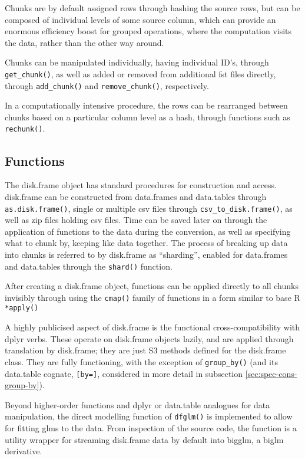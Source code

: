 Chunks are by default assigned rows through hashing the source rows, but
can be composed of individual levels of some source column, which can
provide an enormous efficiency boost for grouped operations, where the
computation visits the data, rather than the other way around.

Chunks can be manipulated individually, having individual ID's, through
\texttt{get_chunk()}, as well as added or
removed from additional fst files directly, through
\texttt{add_chunk()} and
\texttt{remove_chunk()}, respectively.

In a computationally intensive procedure, the rows can be rearranged
between chunks based on a particular column level as a hash, through
functions such as \texttt{rechunk()}.

\hypertarget{sec:functions}{%
    \subsection{Functions}\label{sec:functions}}

The disk.frame object has standard procedures for construction and
access. disk.frame can be constructed from data.frames and data.tables
through \texttt{as.disk.frame()}, single or
multiple csv files through
\texttt{csv_to_disk.frame()}, as well as zip
files holding csv files. Time can be saved later on through the
application of functions to the data during the conversion, as well as
specifying what to chunk by, keeping like data together. The process of
breaking up data into chunks is referred to by disk.frame as
``sharding'', enabled for data.frames and data.tables through the
\texttt{shard()} function.

After creating a disk.frame object, functions can be applied directly to
all chunks invisibly through using the
\texttt{cmap()} family of functions in a form
similar to base R \texttt{*apply()}

A highly publicised aspect of disk.frame is the functional
cross-compatibility with dplyr verbs. These operate on disk.frame
objects lazily, and are applied through translation by disk.frame; they
are just S3 methods defined for the disk.frame class. They are fully
functioning, with the exception of \texttt{group_by()} (and its
data.table cognate, \texttt{[by=]}, considered in more detail in
subsection \cref{sec:spec-cons-group-by}).

Beyond higher-order functions and dplyr or data.table analogues for data
manipulation, the direct modelling function of
\texttt{dfglm()} is implemented to allow for
fitting glms to the data. From inspection of the source code, the
function is a utility wrapper for streaming disk.frame data by default
into bigglm, a biglm derivative.


